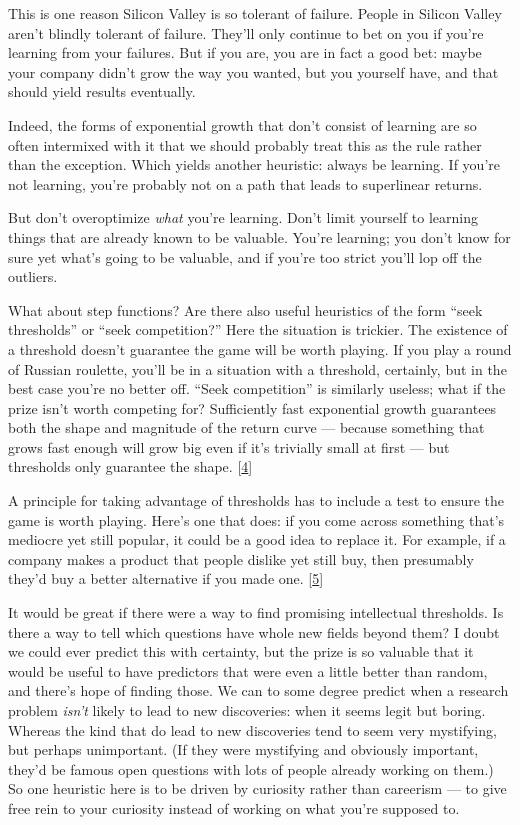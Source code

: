 This is one reason Silicon Valley is so tolerant of failure. People in
Silicon Valley aren't blindly tolerant of failure. They'll only continue
to bet on you if you're learning from your failures. But if you are, you
are in fact a good bet: maybe your company didn't grow the way you
wanted, but you yourself have, and that should yield results eventually.

Indeed, the forms of exponential growth that don't consist of learning
are so often intermixed with it that we should probably treat this as
the rule rather than the exception. Which yields another heuristic:
always be learning. If you're not learning, you're probably not on a
path that leads to superlinear returns.

But don't overoptimize \emph{what} you're learning. Don't limit yourself
to learning things that are already known to be valuable. You're
learning; you don't know for sure yet what's going to be valuable, and
if you're too strict you'll lop off the outliers.

What about step functions? Are there also useful heuristics of the form
``seek thresholds'' or ``seek competition?'' Here the situation is
trickier. The existence of a threshold doesn't guarantee the game will
be worth playing. If you play a round of Russian roulette, you'll be in
a situation with a threshold, certainly, but in the best case you're no
better off. ``Seek competition'' is similarly useless; what if the prize
isn't worth competing for? Sufficiently fast exponential growth
guarantees both the shape and magnitude of the return curve --- because
something that grows fast enough will grow big even if it's trivially
small at first --- but thresholds only guarantee the shape.
{[}\hyperref[f4n]{4}{]}

A principle for taking advantage of thresholds has to include a test to
ensure the game is worth playing. Here's one that does: if you come
across something that's mediocre yet still popular, it could be a good
idea to replace it. For example, if a company makes a product that
people dislike yet still buy, then presumably they'd buy a better
alternative if you made one. {[}\hyperref[f5n]{5}{]}

It would be great if there were a way to find promising intellectual
thresholds. Is there a way to tell which questions have whole new fields
beyond them? I doubt we could ever predict this with certainty, but the
prize is so valuable that it would be useful to have predictors that
were even a little better than random, and there's hope of finding
those. We can to some degree predict when a research problem
\emph{isn't} likely to lead to new discoveries: when it seems legit but
boring. Whereas the kind that do lead to new discoveries tend to seem
very mystifying, but perhaps unimportant. (If they were mystifying and
obviously important, they'd be famous open questions with lots of people
already working on them.) So one heuristic here is to be driven by
curiosity rather than careerism --- to give free rein to your curiosity
instead of working on what you're supposed to.

